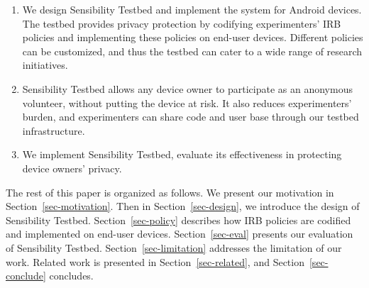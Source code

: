 \begin{enumerate}

\item We design Sensibility Testbed and implement the 
system for Android devices. The testbed provides privacy protection by 
codifying experimenters' IRB policies and implementing 
these policies on end-user devices. Different policies can 
be customized, and thus the testbed can cater to a wide 
range of research initiatives.


\item Sensibility Testbed allows any device owner to participate 
as an anonymous volunteer, without putting the device at risk. 
It also reduces experimenters' burden, and experimenters can share 
code and user base through our testbed infrastructure.


\item We implement Sensibility Testbed, evaluate its effectiveness
in protecting device owners' privacy. 
\end{enumerate}

The rest of this paper is organized as follows. We present our
motivation in Section~\ref{sec-motivation}. Then in Section~\ref{sec-design}, 
we introduce the design of Sensibility Testbed. Section~\ref{sec-policy}
describes how IRB policies are codified and implemented on end-user
devices. Section~\ref{sec-eval} presents our evaluation of Sensibility 
Testbed. Section~\ref{sec-limitation} addresses the limitation of our work.
Related work is presented in Section~\ref{sec-related}, and 
Section~\ref{sec-conclude} concludes.